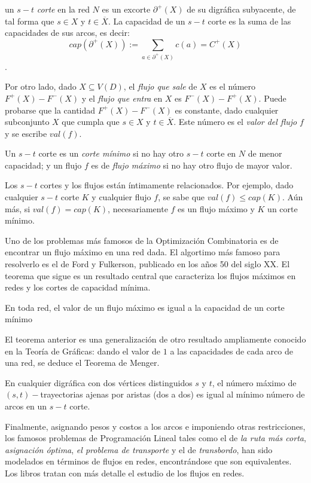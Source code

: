 un $s-t$ \textit{corte} en la red $N$ es un excorte $\partial^{+}(X)$ de su digráfica subyacente, de tal forma que $s \in X$ y $t\in \overline{X}$. La capacidad de un $s-t$ corte es la suma de las capacidades de sus arcos, es decir:$$cap(\partial^{+}(X)):=\sum_{a \in \partial^{+}(X)}c(a) = C^{+}(X)$$.

Por otro lado, dado $X\subseteq V(D)$, el \textit{flujo que sale} de $X$ es el número $F^{+}(X)- F^{-}(X)$ y el \textit{flujo que entra} en $X$ es $F^{-}(X)- F^{+}(X)$. Puede probarse que la cantidad  $F^{+}(X)- F^{-}(X)$ es constante, dado cualquier subconjunto $X$ que cumpla que $s \in X$ y $t\in \overline{X}$. Este número es el \textit{valor del flujo $f$} y se escribe $val(f)$.

Un $s -t$ corte es un \textit{corte mínimo} si no hay otro $s-t$ corte en $N$ de menor capacidad; y un flujo $f$ es de \textit{flujo máximo} si no hay otro flujo de mayor valor. 

Los $s -t$ cortes y los flujos están íntimamente relacionados. Por ejemplo, dado cualquier $s-t$ corte $K$ y cualquier flujo $f$, se sabe que $val(f) \leq cap(K)$. Aún más, si $val(f) = cap(K)$, necesariamente $f$ es un flujo máximo y $K$ un corte  mínimo.

Uno de los problemas más famosos de la Optimización Combinatoria es de encontrar un flujo máximo en una red dada. El algortimo más famoso para resolverlo es el de Ford y Fulkerson, publicado en los años 50 del siglo XX. El teorema que sigue es un resultado central que caracteriza los flujos máximos en redes y los cortes de capacidad mínima.

\begin{teo}
En toda red, el valor de un flujo máximo es igual a la capacidad de un corte mínimo
\end{teo}

El teorema anterior es una generalización de otro resultado ampliamente conocido en la Teoría de Gráficas: dando el valor de $1$ a las capacidades de cada arco de una red, se deduce el Teorema de Menger.

\begin{teo}
En cualquier digráfica con dos vértices distinguidos $s$ y $t$, el número máximo de $(s,t)-$trayectorias ajenas por aristas (dos a dos) es igual al mínimo número de arcos en un $s-t$ corte.
\end{teo}

Finalmente, asignando pesos y costos a los arcos e imponiendo otras restricciones, los famosos problemas de Programación Lineal tales como el de \textit{la ruta más corta}, \textit{asignación óptima}, \textit{el problema de transporte} y el de \textit{transbordo}, han sido modelados en términos de flujos en redes, encontrándose que son equivalentes. Los libros \cite{FordFulkerosns, Chen, Chen2, Bondy, Korte} tratan con más detalle el estudio de los flujos en redes.

